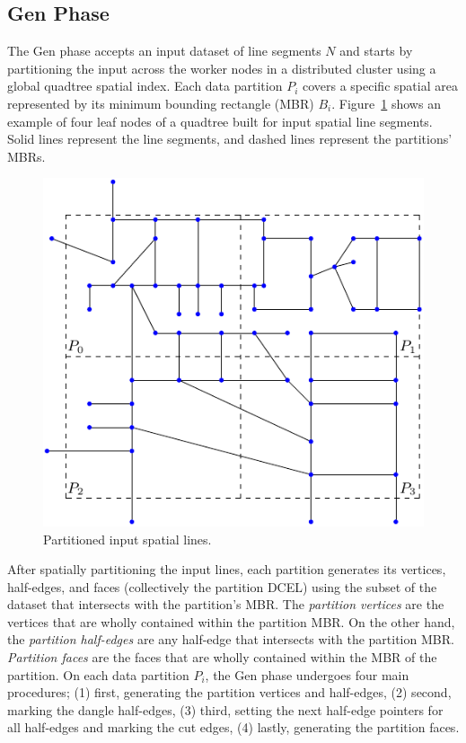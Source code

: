 \subsection{Gen Phase}
\label{sec:gen}

The Gen phase accepts an input dataset of line segments $N$ and starts by partitioning the input across the worker nodes in a distributed cluster using a global quadtree spatial index.
Each data partition $P_i$ covers a specific spatial area represented by its minimum bounding rectangle (MBR) $B_i$.
Figure~\ref{fig:ddcel:input} shows an example of four leaf nodes of a quadtree built for input spatial line segments. Solid lines represent the line segments, and dashed lines represent the partitions' MBRs.

\begin{figure}[tb]
	\centering
	\includegraphics[width=0.75 \linewidth ]{chapterSDCEL/model/input-network}
	\caption{Partitioned input spatial lines.}
	\label{fig:ddcel:input}
\end{figure}

After spatially partitioning the input lines, each partition generates its vertices, half-edges, and faces (collectively the partition DCEL) using the subset of 
the dataset that intersects with the partition's MBR.
The \textit{partition vertices} are the vertices that are wholly contained within the partition MBR. 
On the other hand, the \textit{partition half-edges} are any half-edge that intersects with the partition MBR.
\textit{Partition faces} are the faces that are wholly contained within the MBR of the partition.
On each data partition $P_i$, the Gen phase undergoes four main procedures; 
(1) first, generating the partition vertices and half-edges, 
(2) second, marking the dangle half-edges, 
(3) third, setting the next half-edge pointers for all half-edges and marking the cut edges, 
(4) lastly, generating the partition faces. 

